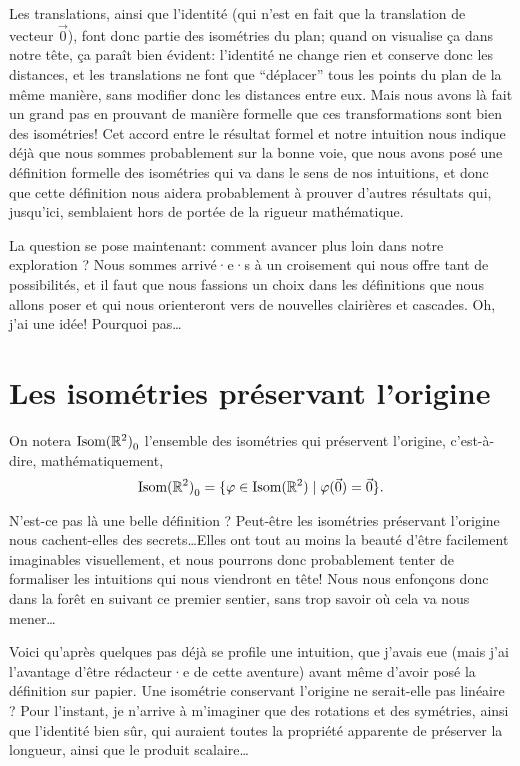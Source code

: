 \documentclass{book}
\numberwithin{equation}{section}
\renewcommand{\phi}{\varphi}
\providecommand{\plan}{{\mathbb R^2}}
\providecommand{\origin}{{\vec 0}}
\providecommand{\isom}{{\textnormal{Isom}(\plan)}}
\providecommand{\isomo}{{\isom_0}}
\providecommand{\st}{\mid}
\begin{document}
Les translations, ainsi que l'identité (qui n'est en fait que la translation de vecteur $\origin$), font donc partie des isométries du plan; quand on visualise ça dans notre tête, ça paraît bien évident: l'identité ne change rien et conserve donc les distances, et les translations ne font que ``déplacer'' tous les points du plan de la même manière, sans modifier donc les distances entre eux. Mais nous avons là fait un grand pas en prouvant de manière formelle que ces transformations sont bien des isométries! Cet accord entre le résultat formel et notre intuition nous indique déjà que nous sommes probablement sur la bonne voie, que nous avons posé une définition formelle des isométries qui va dans le sens de nos intuitions, et donc que cette définition nous aidera probablement à prouver d'autres résultats qui, jusqu'ici, semblaient hors de portée de la rigueur mathématique.\par
La question se pose maintenant: comment avancer plus loin dans notre exploration ? Nous sommes arrivé·e·s à un croisement qui nous offre tant de possibilités, et il faut que nous fassions un choix dans les définitions que nous allons poser et qui nous orienteront vers de nouvelles clairières et cascades. Oh, j'ai une idée! Pourquoi pas\dots

\section{Les isométries préservant l'origine}

\begin{defn}
	On notera $\isomo$ l'ensemble des isométries qui préservent l'origine, c'est-à-dire, mathématiquement,
	\begin{equation*}
		\isomo = \{\phi \in \isom \st \phi(\origin) = \origin\}.
	\end{equation*}
\end{defn}

N'est-ce pas là une belle définition ? Peut-être les isométries préservant l'origine nous cachent-elles des secrets\dots Elles ont tout au moins la beauté d'être facilement imaginables visuellement, et nous pourrons donc probablement tenter de formaliser les intuitions qui nous viendront en tête! Nous nous enfonçons donc dans la forêt en suivant ce premier sentier, sans trop savoir où cela va nous mener\dots\par

Voici qu'après quelques pas déjà se profile une intuition, que j'avais eue (mais j'ai l'avantage d'être rédacteur·e de cette aventure) avant même d'avoir posé la définition sur papier. Une isométrie conservant l'origine ne serait-elle pas linéaire ? Pour l'instant, je n'arrive à m'imaginer que des rotations et des symétries, ainsi que l'identité bien sûr, qui auraient toutes la propriété apparente de préserver la longueur, ainsi que le produit scalaire\dots
\end{document}
